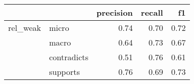 \begin{tabular}{llrrr}
\toprule
         &          &  precision &  recall &   f1 \\
\midrule
rel\_weak & micro &       0.74 &    0.70 & 0.72 \\
         & macro &       0.64 &    0.73 & 0.67 \\
         & contradicts &       0.51 &    0.76 & 0.61 \\
         & supports &       0.76 &    0.69 & 0.73 \\
\bottomrule
\end{tabular}
